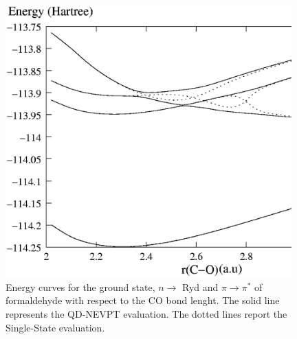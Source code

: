 \begin{center}
\begin{figure}[ht]
\begin{center}
\includegraphics[width=11cm]{03_nevpt/images/formaldehyde-qdpt-curve.eps}
\end{center}
\caption{\footnotesize Energy curves for the ground state, $n \rightarrow$
Ryd and $\pi \rightarrow \pi^{*}$ of formaldehyde with respect to the CO
bond lenght. The solid line represents the QD-NEVPT evaluation. The dotted
lines report the Single-State evaluation.}
\label{fig:formaldehyde_qdpt_curve}
\end{figure}
\end{center}
